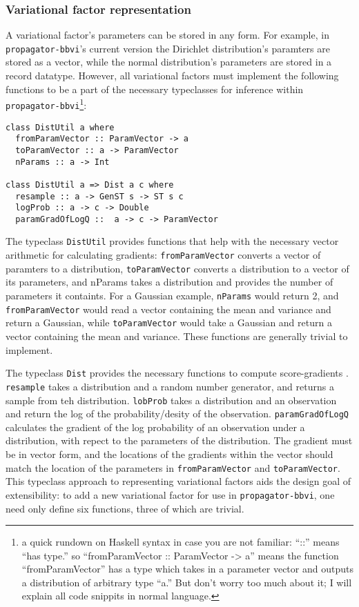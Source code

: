 \documentclass[12pt]{article}
\begin{document}
\subsubsection{Variational factor representation}

A variational factor's parameters can be stored in any form. For
example, in \texttt{propagator-bbvi}'s current version the Dirichlet
distribution's paramters are stored as a vector, while the normal
distribution's parameters are stored in a record datatype. However,
all variational factors must implement the following functions to be a
part of the necessary typeclasses for inference within
\texttt{propagator-bbvi}\footnote{a quick rundown on Haskell syntax in
  case you are not familiar: ``::'' means ``has type.'' so
  ``fromParamVector :: ParamVector -> a'' means the function
  ``fromParamVector'' has a type which takes in a parameter vector and
  outputs a distribution of arbitrary type ``a.'' But don't worry too
  much about it; I will explain all code snippits in normal language.}:

\begin{verbatim}
class DistUtil a where
  fromParamVector :: ParamVector -> a
  toParamVector :: a -> ParamVector
  nParams :: a -> Int

class DistUtil a => Dist a c where
  resample :: a -> GenST s -> ST s c
  logProb :: a -> c -> Double
  paramGradOfLogQ ::  a -> c -> ParamVector
\end{verbatim}

The typeclass \texttt{DistUtil} provides functions that help with the
necessary vector arithmetic for calculating gradients:
\texttt{fromParamVector} converts a vector of paramters to a
distribution, \texttt{toParamVector} converts a distribution to a
vector of its parameters, and nParams takes a distribution and
provides the number of parameters it containts. For a Gaussian
example, \texttt{nParams} would return 2, and \texttt{fromParamVector}
would read a vector containing the mean and variance and return a
Gaussian, while \texttt{toParamVector} would take a Gaussian and
return a vector containing the mean and variance. These functions are
generally trivial to implement.

The typeclass \texttt{Dist} provides the necessary functions to
compute score-gradients \citep{ranganath-2014}. \texttt{resample}
takes a distribution and a random number generator, and returns a
sample from teh distribution. \texttt{lobProb} takes a distribution
and an observation and return the log of the probability/desity of the
observation. \texttt{paramGradOfLogQ} calculates the gradient of the
log probability of an observation under a distribution, with repect to
the parameters of the distribution. The gradient must be in vector
form, and the locations of the gradients within the vector should
match the location of the parameters in \texttt{fromParamVector} and
\texttt{toParamVector}. This typeclass approach to representing
variational factors aids the design goal of extensibility: to add a
new variational factor for use in \texttt{propagator-bbvi}, one need
only define six functions, three of which are trivial.
\end{document}
